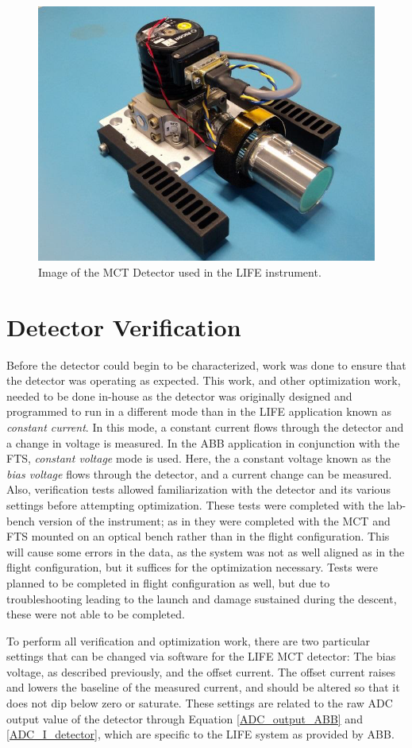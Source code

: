 \begin{figure}[h]
  \centering
  \includegraphics[width=0.6\linewidth]{chap5_images/Detector_from_ICD.png}
  \caption{Image of the MCT Detector used in the LIFE instrument.}
  \label{fig:life_detector_from_ICD}
\end{figure}

\section{Detector Verification}\label{detector_verif}
Before the detector could begin to be characterized, work was done to ensure that the detector was operating as expected. This work, and other optimization work, needed to be done in-house as the detector was originally designed and programmed to run in a different mode than in the LIFE application known as \textit{constant current}. In this mode, a constant current flows through the detector and a change in voltage is measured. In the ABB application in conjunction with the FTS, \textit{constant voltage} mode is used. Here, the a constant voltage known as the \textit{bias voltage} flows through the detector, and a current change can be measured. Also, verification tests allowed familiarization with the detector and its various settings before attempting optimization. These tests were completed with the lab-bench version of the instrument; as in they were completed with the MCT and FTS mounted on an optical bench rather than in the flight configuration. This will cause some errors in the data, as the system was not as well aligned as in the flight configuration, but it suffices for the optimization necessary. Tests were planned to be completed in flight configuration as well, but due to troubleshooting leading to the launch and damage sustained during the descent, these were not able to be completed.

To perform all verification and optimization work, there are two particular settings that can be changed via software for the LIFE MCT detector: The bias voltage, as described previously, and the offset current. The offset current raises and lowers the baseline of the measured current, and should be altered so that it does not dip below zero or saturate. These settings are related to the raw ADC output value of the detector through Equation \ref{ADC_output_ABB} and \ref{ADC_I_detector}, which are specific to the LIFE system as provided by ABB.

